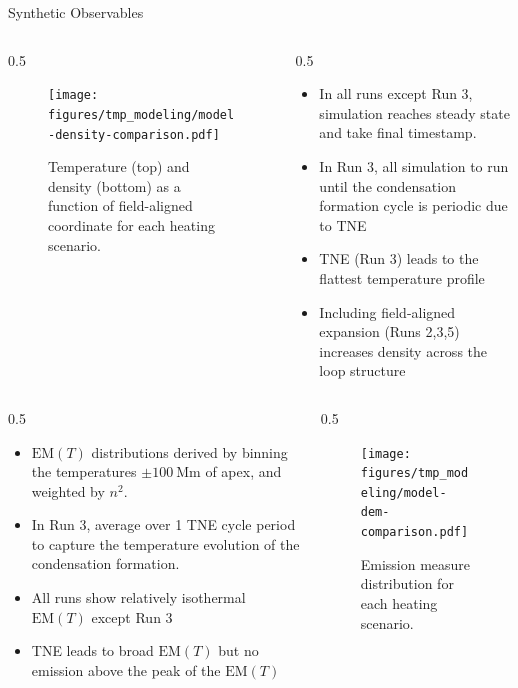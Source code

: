 \documentclass[final]{beamer}
\newlength{\colwidth}
\begin{document}
\begin{frame}[t]
\begin{columns}[t]
\begin{column}{\colwidth}
\begin{block}{Synthetic Observables}
    \begin{columns}[c]
      \begin{column}{0.5\colwidth}
        \begin{figure}
          \centering
          \texttt{[image: figures/tmp\_modeling/model-density-comparison.pdf]}
          \caption{Temperature (top) and density (bottom) as a function of field-aligned coordinate for each heating scenario.}
          \label{fig:temperature_density_profiles}
        \end{figure}
      \end{column}
      \begin{column}{0.5\colwidth}
        \begin{itemize}
          \item In all runs except Run 3, simulation reaches steady state and take final timestamp. 
          \item In Run 3, all simulation to run until the condensation formation cycle is periodic due to TNE
          \item TNE (Run 3) leads to the flattest temperature profile
          \item Including field-aligned expansion (Runs 2,3,5) increases density across the loop structure
        \end{itemize}
      \end{column}
    \end{columns}


    \begin{columns}[c]
      \begin{column}{0.5\colwidth}
        \begin{itemize}
          \item $\mathrm{EM}(T)$ distributions derived by binning the temperatures $\pm\SI{100}{\mega\m}$ of apex, and weighted by $n^2$. \item In Run 3, average over 1 TNE cycle period to capture the temperature evolution of the condensation formation.
          \item All runs show relatively isothermal $\mathrm{EM}(T)$ except Run 3
          \item TNE leads to broad $\mathrm{EM}(T)$ but no emission above the peak of the $\mathrm{EM}(T)$
        \end{itemize}
      \end{column}
      \begin{column}{0.5\colwidth}
        \begin{figure}
          \texttt{[image: figures/tmp\_modeling/model-dem-comparison.pdf]}
          \label{fig:model_dem}
          \caption{Emission measure distribution for each heating scenario.}
        \end{figure}
      \end{column}
    \end{columns}


\end{block}
\end{column}
\end{columns}
\end{frame}
\end{document}
